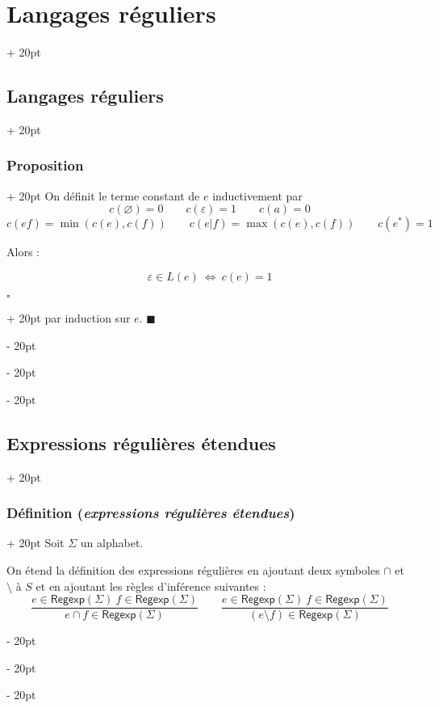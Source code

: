 \documentclass[a4paper, 12pt, twoside]{article}
\newcommand{\ssi}{\ \Leftrightarrow \ }
\newcommand{\ind}[1][20pt]{\advance\leftskip + #1}
\newcommand{\deind}[1][20pt]{\advance\leftskip - #1}
\newenvironment{indt}[2][20pt]{#2 \par \ind[#1]}{\par \deind} %
\newenvironment{proof}[1][{}]{\begin{indt}{$\square$ #1}}{$\blacksquare$ \end{indt}}
\newcommand{\Regexp}{\mathsf{Regexp}}
\begin{document}
\begin{indt}{\section{Langages réguliers}}
\begin{indt}{\subsection{Langages réguliers}}
\begin{indt}{\subsubsection{Proposition}}
                On définit le terme constant de $e$ inductivement par
                \[
                    c(\varnothing) = 0
                    \qquad
                    c(\varepsilon) = 1
                    \qquad
                    c(a) = 0
                \]
                \[
                    c(ef) = \min(c(e), c(f))
                    \qquad
                    c(e|f) = \max(c(e), c(f))
                    \qquad
                    c(e^*) = 1
                \]

                \vspace{6pt}
                
                Alors :
                \begin{emphBox}
                    \[
                        \varepsilon \in L(e) \ssi c(e) = 1
                    \]
                \end{emphBox}

                \vspace{12pt}
                
                \begin{proof}
                     par induction sur $e$.
                \end{proof}
            \end{indt}
        \end{indt}

        \vspace{12pt}
        
        \begin{indt}{\subsection{Expressions régulières étendues}}
            \begin{indt}{\subsubsection{Définition (\textit{expressions régulières étendues})}}
                Soit $\Sigma$ un alphabet.

                On étend la définition des expressions régulières en ajoutant deux symboles $\cap$ et $\setminus$ à $S$ et en ajoutant les règles d'inférence suivantes :
                \[
                    \dfrac{e \in \Regexp(\Sigma)\ f \in \Regexp(\Sigma)}{e \cap f \in \Regexp(\Sigma)}
                    \qquad
                    \dfrac{e \in \Regexp(\Sigma)\ f \in \Regexp(\Sigma)}{(e \setminus f) \in \Regexp(\Sigma)}
                \]


\end{indt}
\end{indt}
\end{indt}
\end{document}
